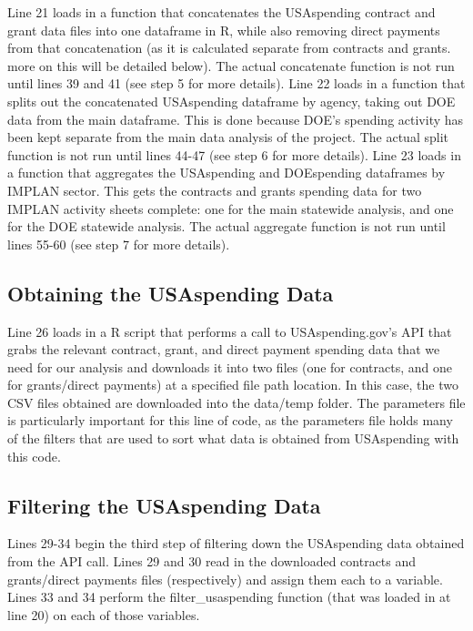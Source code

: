 \documentclass[
]{book}
\begin{document}
Line 21 loads in a function that concatenates the USAspending contract and grant data files into one dataframe in R, while also removing direct payments from that concatenation (as it is calculated separate from contracts and grants. more on this will be detailed below). The actual concatenate function is not run until lines 39 and 41 (see step 5 for more details). Line 22 loads in a function that splits out the concatenated USAspending dataframe by agency, taking out DOE data from the main dataframe. This is done because DOE's spending activity has been kept separate from the main data analysis of the project. The actual split function is not run until lines 44-47 (see step 6 for more details). Line 23 loads in a function that aggregates the USAspending and DOEspending dataframes by IMPLAN sector. This gets the contracts and grants spending data for two IMPLAN activity sheets complete: one for the main statewide analysis, and one for the DOE statewide analysis. The actual aggregate function is not run until lines 55-60 (see step 7 for more details).

\hypertarget{obtaining-the-usaspending-data}{%
\subsection{Obtaining the USAspending Data}\label{obtaining-the-usaspending-data}}

Line 26 loads in a R script that performs a call to USAspending.gov's API that grabs the relevant contract, grant, and direct payment spending data that we need for our analysis and downloads it into two files (one for contracts, and one for grants/direct payments) at a specified file path location. In this case, the two CSV files obtained are downloaded into the data/temp folder. The parameters file is particularly important for this line of code, as the parameters file holds many of the filters that are used to sort what data is obtained from USAspending with this code.

\hypertarget{filtering-the-usaspending-data}{%
\subsection{Filtering the USAspending Data}\label{filtering-the-usaspending-data}}

Lines 29-34 begin the third step of filtering down the USAspending data obtained from the API call. Lines 29 and 30 read in the downloaded contracts and grants/direct payments files (respectively) and assign them each to a variable. Lines 33 and 34 perform the filter\_usaspending function (that was loaded in at line 20) on each of those variables.
\end{document}
